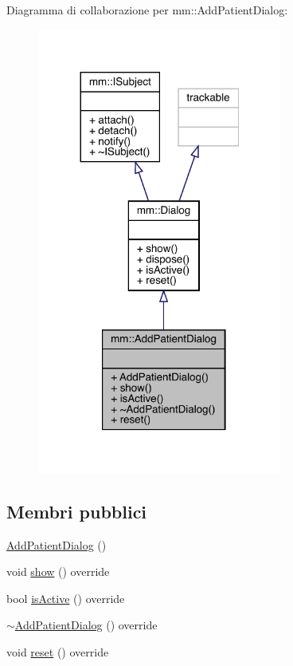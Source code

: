 Diagramma di collaborazione per mm\+:\+:Add\+Patient\+Dialog\+:\nopagebreak
\begin{figure}[H]
\begin{center}
\leavevmode
\includegraphics[width=228pt]{d5/d54/classmm_1_1_add_patient_dialog__coll__graph}
\end{center}
\end{figure}
\subsection*{Membri pubblici}
\begin{DoxyCompactItemize}
\item 
\hyperlink{classmm_1_1_add_patient_dialog_ad81abcf242a1c103f76c1fd4c6406b57}{Add\+Patient\+Dialog} ()
\item 
void \hyperlink{classmm_1_1_add_patient_dialog_a0247912794984eb19c43842ab9037708}{show} () override
\item 
bool \hyperlink{classmm_1_1_add_patient_dialog_a459a8acbec1c8a5a87e00f23402d3b5d}{is\+Active} () override
\item 
\hyperlink{classmm_1_1_add_patient_dialog_ab78d97d19d77fe6f47fbcd8af6a7b709}{$\sim$\+Add\+Patient\+Dialog} () override
\item 
void \hyperlink{classmm_1_1_add_patient_dialog_a64c8c2ea3b1c69a858f4eaec1854270a}{reset} () override
\end{DoxyCompactItemize}


